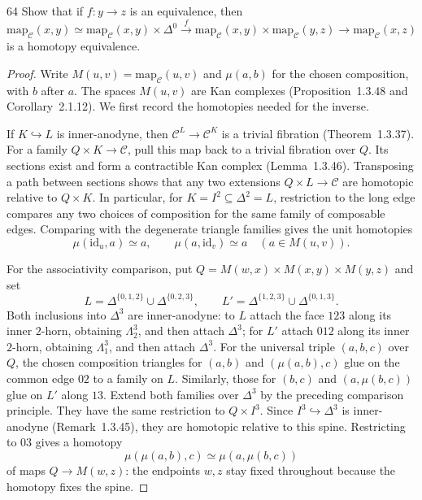 \begin{exercise}{64}
Show that if $f\colon y\to z$ is an equivalence, then
\[
 \mathrm{map}_{\mathcal C}(x,y)
 \simeq \mathrm{map}_{\mathcal C}(x,y)\times\Delta^0
 \xrightarrow{f}
 \mathrm{map}_{\mathcal C}(x,y)\times\mathrm{map}_{\mathcal C}(y,z)
 \longrightarrow \mathrm{map}_{\mathcal C}(x,z)
\]
is a homotopy equivalence.

\begin{proof}
Write $M(u,v)=\mathrm{map}_{\mathcal C}(u,v)$ and
$\mu(a,b)$ for the chosen composition, with $b$ after $a$.
The spaces $M(u,v)$ are Kan complexes
(Proposition~1.3.48 and Corollary~2.1.12).
We first record the homotopies needed for the inverse.

If $K\hookrightarrow L$ is inner-anodyne, then
$\mathcal C^L\to\mathcal C^K$ is a trivial fibration
(Theorem~1.3.37).
For a family $Q\times K\to\mathcal C$, pull this map back
to a trivial fibration over $Q$.
Its sections exist and form a contractible Kan complex
(Lemma~1.3.46).
Transposing a path between sections shows that any two
extensions $Q\times L\to\mathcal C$ are homotopic relative
to $Q\times K$.
In particular, for $K=I^2\subseteq\Delta^2=L$, restriction
to the long edge compares any two choices of composition
for the same family of composable edges.
Comparing with the degenerate triangle families gives the
unit homotopies
\[
 \mu(\mathrm{id}_u,a)\simeq a,
 \qquad \mu(a,\mathrm{id}_v)\simeq a
 \quad(a\in M(u,v)).
\]

For the associativity comparison, put
$Q=M(w,x)\times M(x,y)\times M(y,z)$ and set
\[
 L=\Delta^{\{0,1,2\}}\cup\Delta^{\{0,2,3\}},
 \qquad
 L'=\Delta^{\{1,2,3\}}\cup\Delta^{\{0,1,3\}}.
\]
Both inclusions into $\Delta^3$ are inner-anodyne:
to $L$ attach the face $123$ along its inner $2$-horn,
obtaining $\Lambda^3_2$, and then attach $\Delta^3$;
for $L'$ attach $012$ along its inner $2$-horn,
obtaining $\Lambda^3_1$, and then attach $\Delta^3$.
For the universal triple $(a,b,c)$ over $Q$, the chosen
composition triangles for $(a,b)$ and $(\mu(a,b),c)$
glue on the common edge $02$ to a family on $L$.
Similarly, those for $(b,c)$ and $(a,\mu(b,c))$ glue on
$L'$ along $13$.
Extend both families over $\Delta^3$ by the preceding
comparison principle.
They have the same restriction to $Q\times I^3$.
Since $I^3\hookrightarrow\Delta^3$ is inner-anodyne
(Remark~1.3.45), they are homotopic relative to this spine.
Restricting to $03$ gives a homotopy
\[
 \mu(\mu(a,b),c)\simeq\mu(a,\mu(b,c))
\]
of maps $Q\to M(w,z)$: the endpoints $w,z$ stay fixed
throughout because the homotopy fixes the spine.


\end{proof}
\end{exercise}
